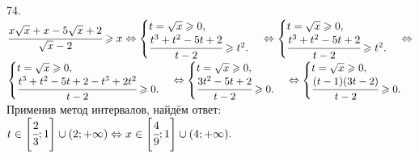 74. $\cfrac{x\sqrt{x}+x-5\sqrt{x}+2}{\sqrt{x}-2}\geqslant x \Leftrightarrow \begin{cases} t=\sqrt{x}\geqslant0,\\ \cfrac{t^3+t^2-5t+2}{t-2}\geqslant t^2.\end{cases}
\Leftrightarrow \begin{cases} t=\sqrt{x}\geqslant0,\\ \cfrac{t^3+t^2-5t+2}{t-2}\geqslant t^2.\end{cases}
\Leftrightarrow$\\$ \begin{cases} t=\sqrt{x}\geqslant0,\\ \cfrac{t^3+t^2-5t+2-t^3+2t^2}{t-2}\geqslant 0.\end{cases}
\Leftrightarrow \begin{cases} t=\sqrt{x}\geqslant0,\\ \cfrac{3t^2-5t+2}{t-2}\geqslant 0.\end{cases}
\Leftrightarrow \begin{cases} t=\sqrt{x}\geqslant0,\\ \cfrac{(t-1)(3t-2)}{t-2}\geqslant 0.\end{cases}$ Применив метод интервалов, найдём ответ: $t\in\left[\cfrac{2}{3};1\right]\cup(2;+\infty)\Leftrightarrow x \in\left[\cfrac{4}{9};1\right]\cup(4;+\infty).$
\begin{figure}[ht!]
\end{figure}\\
